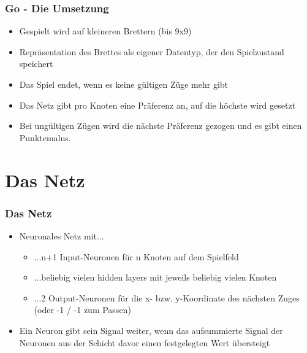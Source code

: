 \documentclass[compress]{beamer}
\begin{document}
\begin{frame}
	\frametitle{Go - Die Umsetzung}
	
	\begin{itemize}
		\item Gespielt wird auf kleineren Brettern (bis 9x9)
		\item Repräsentation des Brettes als eigener Datentyp, der den Spielzustand speichert
		\item Das Spiel endet, wenn es keine gültigen Züge mehr gibt
		\item Das Netz gibt pro Knoten eine Präferenz an, auf die höchste wird gesetzt
		\item Bei ungültigen Zügen wird die nächste Präferenz gezogen und es gibt einen Punktemalus. 
	\end{itemize}		
	
\end{frame}

\section{Das Netz}

\begin{frame}[fragile]
	\frametitle{Das Netz}

	\begin{itemize}
		\item Neuronales Netz mit...

		\begin{itemize}
			\item ...n+1 Input-Neuronen für n Knoten auf dem Spielfeld
			\item ...beliebig vielen hidden layers mit jeweils beliebig vielen Knoten
			\item ...2 Output-Neuronen für die x- bzw. y-Koordinate des nächsten Zuges (oder -1 / -1 zum Passen)
		\end{itemize}

		\item Ein Neuron gibt sein Signal weiter, wenn das aufsummierte Signal der Neuronen aus der Schicht davor einen festgelegten Wert übersteigt
	\end{itemize}
\end{frame}
\end{document}
